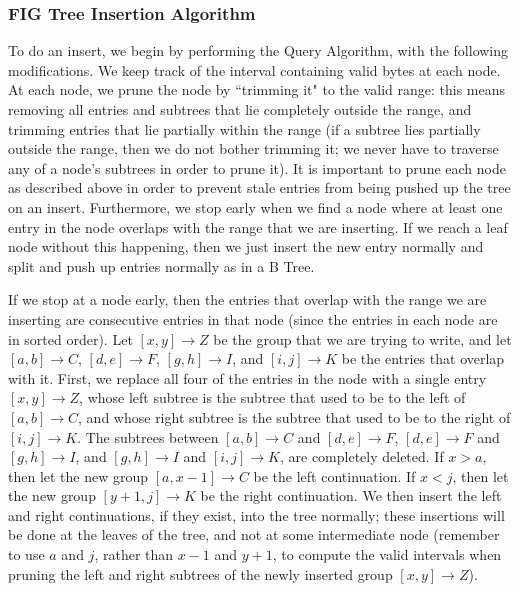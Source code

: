 \documentclass{acm_proc_article-sp}
\begin{document}
\subsubsection{FIG Tree Insertion Algorithm}

To do an insert, we begin by performing the Query Algorithm, with the following modifications. We keep track of the interval containing valid bytes at each node. At each node, we prune the node by ``trimming it" to the valid range: this means removing all entries and subtrees that lie completely outside the range, and trimming entries that lie partially within the range (if a subtree lies partially outside the range, then we do not bother trimming it; we never have to traverse any of a node's subtrees in order to prune it). It is important to prune each node as described above in order to prevent stale entries from being pushed up the tree on an insert. Furthermore, we stop early when we find a node where at least one entry in the node overlaps with the range that we are inserting. If we reach a leaf node without this happening, then we just insert the new entry normally and split and push up entries normally as in a B Tree.

If we stop at a node early, then the entries that overlap with the range we are inserting are consecutive entries in that node (since the entries in each node are in sorted order). Let $[x, y] \rightarrow Z$ be the group that we are trying to write, and let $[a, b] \rightarrow C$, $[d, e] \rightarrow F$, $[g, h] \rightarrow I$, and $[i, j] \rightarrow K$ be the entries that overlap with it. First, we replace all four of the entries in the node with a single entry $[x, y] \rightarrow Z$, whose left subtree is the subtree that used to be to the left of $[a, b] \rightarrow C$, and whose right subtree is the subtree that used to be to the right of $[i, j] \rightarrow K$. The subtrees between $[a, b] \rightarrow C$ and $[d, e] \rightarrow F$, $[d, e] \rightarrow F$ and $[g, h] \rightarrow I$, and $[g, h] \rightarrow I$ and $[i, j] \rightarrow K$, are completely deleted. If $x > a$, then let the new group $[a, x - 1] \rightarrow C$ be the left continuation. If $x < j$, then let the new group $[y + 1, j] \rightarrow K$ be the right continuation. We then insert the left and right continuations, if they exist, into the tree normally; these insertions will be done at the leaves of the tree, and not at some intermediate node (remember to use $a$ and $j$, rather than $x - 1$ and $y + 1$, to compute the valid intervals when pruning the left and right subtrees of the newly inserted group $[x, y] \rightarrow Z$).
\end{document}
